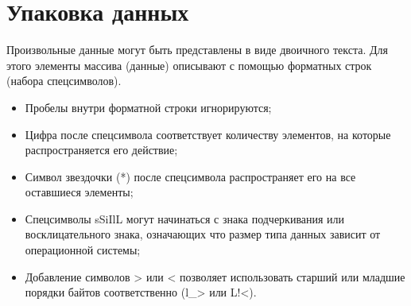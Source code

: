 \hypertarget{apppack}{}
\chapter{Упаковка данных}

Произвольные данные могут быть представлены в виде двоичного текста. Для этого элементы массива (данные) описывают с помощью форматных строк (набора спецсимволов).

\begin{itemize}
  \item Пробелы внутри форматной строки игнорируются;

  \item Цифра после спецсимвола соответствует количеству элементов, на которые распространяется его действие;
  
  \item Символ звездочки (*) после спецсимвола распространяет его на все оставшиеся элементы;
  
  \item Спецсимволы sSiIlL могут начинаться с знака подчеркивания или восклицательного знака, означающих что размер типа данных зависит от операционной системы;

  \item Добавление символов > или < позволяет использовать старший или младшие порядки байтов соответственно (l_> или L!<).
\end{itemize}

